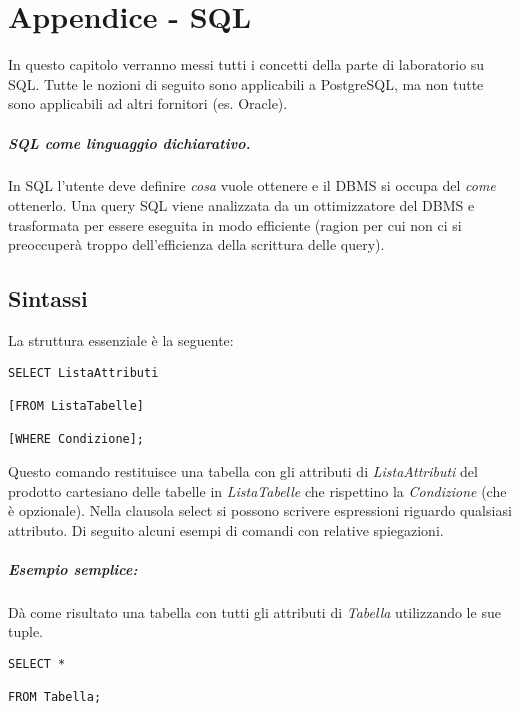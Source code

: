 \chapter{Appendice - SQL}

In questo capitolo verranno messi tutti i concetti della parte di laboratorio su SQL. Tutte le nozioni di seguito sono applicabili a PostgreSQL, ma non tutte sono applicabili ad altri fornitori (es. Oracle).

\paragraph{SQL come linguaggio dichiarativo.}   In SQL l'utente deve definire \textit{cosa} vuole ottenere e il DBMS si occupa del \textit{come} ottenerlo. Una query SQL viene analizzata da un ottimizzatore del DBMS e trasformata per essere eseguita in modo efficiente (ragion per cui non ci si preoccuperà troppo dell'efficienza della scrittura delle query).

\section{Sintassi}

La struttura essenziale è la seguente:

\begin{lstlisting}[style=SQL, caption=Struttura base di una query]
SELECT ListaAttributi

[FROM ListaTabelle]

[WHERE Condizione];
\end{lstlisting}

Questo comando restituisce una tabella con gli attributi di \textit{ListaAttributi} del prodotto cartesiano delle tabelle in \textit{ListaTabelle} che rispettino la \textit{Condizione} (che è opzionale). Nella clausola select si possono scrivere espressioni riguardo qualsiasi attributo. Di seguito alcuni esempi di comandi con relative spiegazioni.

\paragraph{Esempio semplice:} Dà come risultato una tabella con tutti gli attributi di \textit{Tabella} utilizzando le sue tuple.

\begin{lstlisting}[style=SQL, caption=Semplice query]
SELECT *

FROM Tabella;
\end{lstlisting}


